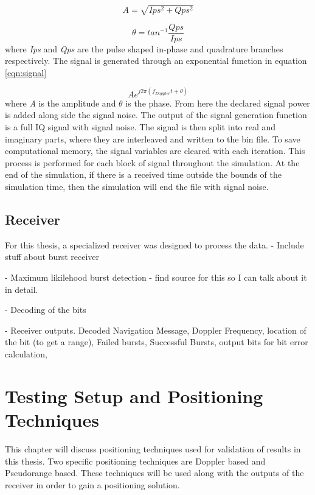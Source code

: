 \documentclass[12pt]{report}
\begin{document}
\begin{equation}
    A = \sqrt{Ips^2 + Qps^2}
    \label{eqn:amplitude}
\end{equation}

\begin{equation}
    \theta = tan^{-1} \frac{Qps}{Ips}
    \label{eqn:phase}
\end{equation}
where \textit{Ips} and \textit{Qps} are the pulse shaped in-phase and quadrature branches respectively. The signal is generated through an exponential function in equation \ref{eqn:signal}

\begin{equation}
    A e^{j2\pi (f_{Doppler}t + \theta)}
    \label{eqn:signal}
\end{equation}
where \textit{A} is the amplitude and $\theta$ is the phase. From here the declared signal power is added along side the signal noise. The output of the signal generation function is a full IQ signal with signal noise. The signal is then split into real and imaginary parts, where they are interleaved and written to the bin file. To save computational memory, the signal variables are cleared with each iteration. This process is performed for each block of signal throughout the simulation. At the end of the simulation, if there is a received time outside the bounds of the simulation time, then the simulation will end the file with signal noise.

\section{Receiver}
For this thesis, a specialized receiver was designed to process the data. 
- Include stuff about burst receiver

- Maximum likilehood burst detection
    - find source for this so I can talk about it in detail.

- Decoding of the bits

- Receiver outputs. Decoded Navigation Message, Doppler Frequency, location of the bit (to get a range), Failed bursts, Successful Bursts, output bits for bit error calculation,

\chapter{Testing Setup and Positioning Techniques}
This chapter will discuss positioning techniques used for validation of results in this thesis. Two specific positioning techniques are Doppler based and Pseudorange based. These techniques will be used along with the outputs of the receiver in order to gain a positioning solution.
 
\end{document}
